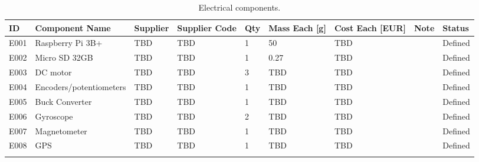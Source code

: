 

\begin{longtable}{|m{}|m{}|m{}|m{}|m{}|m{}|m{}|m{}|m{}|}

\hline
\textbf{ID} & \textbf{Component Name} & \textbf{Supplier} & \textbf{Supplier Code} & \textbf{Qty} & \textbf{Mass Each [g]} & \textbf{Cost Each [EUR]} & \textbf{Note} & \textbf{Status} \\ \hline

E001 & Raspberry Pi 3B+		& TBD & TBD & 1 & 50 	& TBD & & Defined \\\hline
E002 & Micro SD 32GB 		& TBD & TBD & 1 & 0.27 	& TBD & & Defined \\\hline
E003 & DC motor		 		& TBD & TBD & 3 & TBD 	& TBD & & Defined \\\hline
E004 & Encoders/potentiometers 	& TBD & TBD & 1 & TBD 	& TBD & & Defined \\\hline
E005 & Buck Converter 		& TBD & TBD & 1 & TBD 	& TBD & & Defined \\\hline
E006 & Gyroscope 			& TBD & TBD & 2 & TBD 	& TBD & & Defined \\\hline
E007 & Magnetometer 		& TBD & TBD & 1 & TBD 	& TBD & & Defined \\\hline
E008 & GPS 					& TBD & TBD & 1 & TBD 	& TBD & & Defined \\\hline



\caption{Electrical components.}
\label{tab:component-elec}
\end{longtable}
\raggedbottom